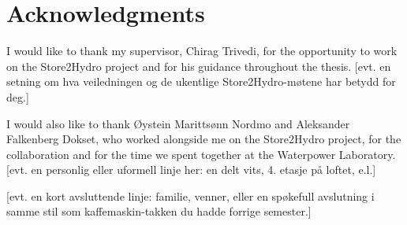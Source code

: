 \chapter*{Acknowledgments}
\label{front:acknow}


I would like to thank my supervisor, Chirag Trivedi, for the opportunity to work on the
Store2Hydro project and for his guidance throughout the thesis.
[evt. en setning om hva veiledningen og de ukentlige Store2Hydro-møtene har betydd for deg.]

I would also like to thank Øystein Marittsønn Nordmo and Aleksander Falkenberg Dokset, who
worked alongside me on the Store2Hydro project, for the collaboration and for the time we
spent together at the Waterpower Laboratory.
[evt. en personlig eller uformell linje her: en delt vits, 4. etasje på loftet, e.l.]

[evt. en kort avsluttende linje: familie, venner, eller en spøkefull avslutning i samme
stil som kaffemaskin-takken du hadde forrige semester.]

\clearpage %
